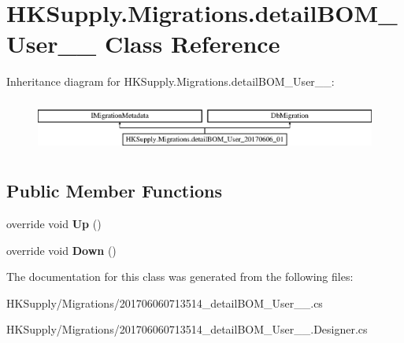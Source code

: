 \hypertarget{class_h_k_supply_1_1_migrations_1_1detail_b_o_m___user__20170606__01}{}\section{H\+K\+Supply.\+Migrations.\+detail\+B\+O\+M\+\_\+\+User\+\_\+\_ Class Reference}
\label{class_h_k_supply_1_1_migrations_1_1detail_b_o_m___user__20170606__01}
Inheritance diagram for H\+K\+Supply.\+Migrations.\+detail\+B\+O\+M\+\_\+\+User\+\_\+\_\+:\begin{figure}[H]
\begin{center}
\leavevmode
\includegraphics[height=1.755486cm]{class_h_k_supply_1_1_migrations_1_1detail_b_o_m___user__20170606__01}
\end{center}
\end{figure}
\subsection*{Public Member Functions}
\begin{DoxyCompactItemize}
\item 
\mbox{\label{class_h_k_supply_1_1_migrations_1_1detail_b_o_m___user__20170606__01_a7cbde3bbc7d64b549be11bb37ef07ed5}} 
override void {\bfseries Up} ()
\item 
\mbox{\label{class_h_k_supply_1_1_migrations_1_1detail_b_o_m___user__20170606__01_a2c376f12d3c150c11621c8eb63a2e29f}} 
override void {\bfseries Down} ()
\end{DoxyCompactItemize}


The documentation for this class was generated from the following files\+:\begin{DoxyCompactItemize}
\item 
H\+K\+Supply/\+Migrations/201706060713514\+\_\+detail\+B\+O\+M\+\_\+\+User\+\_\+\_.\+cs\item 
H\+K\+Supply/\+Migrations/201706060713514\+\_\+detail\+B\+O\+M\+\_\+\+User\+\_\+\_.\+Designer.\+cs\end{DoxyCompactItemize}
